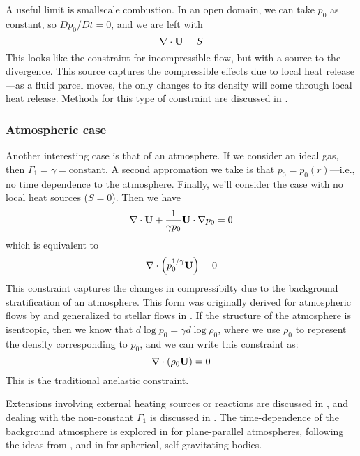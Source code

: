 A useful limit is smallscale combustion.  In an open domain, we can take
$p_0$ as constant, so $Dp_0/Dt = 0$, and we are left with
\begin{equation}
\nabla \cdot {\bf U} = S
\end{equation}
This looks like the constraint for incompressible flow, but with a source
to the divergence.  This source captures the compressible effects due
to local heat release---as a fluid parcel moves, the only changes to
its density will come through local heat release.  Methods for this
type of constraint are discussed in \cite{pember-flame,DayBell:2000,SNpaper}.

\subsubsection{Atmospheric case}

Another interesting case is that of an atmosphere.  If we consider an
ideal gas, then $\Gamma_1 = \gamma = \mathrm{constant}$.  A second
appromation we take is that $p_0 = p_0(r)$---i.e., no time
dependence to the atmosphere.  Finally, we'll consider the case
with no local heat sources ($S = 0$).  Then we have
\begin{equation}
\nabla \cdot {\bf U} + \frac{1}{\gamma p_0} {\bf U} \cdot \nabla p_0 = 0
\end{equation}
which is equivalent to
\begin{equation}
\nabla \cdot \left ( p_0^{1/\gamma} {\bf U} \right ) = 0
\end{equation}
This constraint captures the changes in compressibilty due to the 
background stratification of an atmosphere.  This form was originally
derived for atmospheric flows by \cite{durran:1989} and generalized to
stellar flows in \cite{ABRZ:I}.  If the structure of the
atmosphere is isentropic, then we know that $d\log p_0 = \gamma d\log \rho_0$,
where we use $\rho_0$ to represent the density corresponding to $p_0$, and
we can write this constraint as:
\begin{equation}
\nabla \cdot (\rho_0 {\bf U}) = 0
\end{equation}
This is the traditional anelastic constraint.

Extensions involving external heating sources or reactions are
discussed in \cite{ABRZ:II,ABNZ:III}, and dealing with the
non-constant $\Gamma_1$ is discussed in \cite{ABRZ:I,KP:2012}.  The
time-dependence of the background atmosphere is explored in
\cite{ABRZ:II} for plane-parallel atmospheres, following the ideas
from \cite{almgren:2000}, and in \cite{multilevel} for spherical,
self-gravitating bodies.

